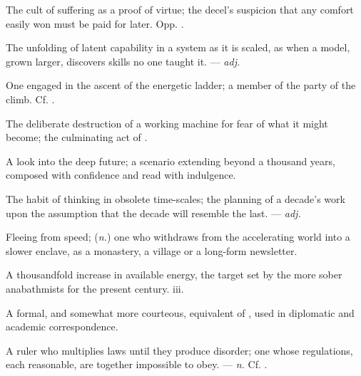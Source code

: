   The cult of suffering as a proof of virtue; the decel's suspicion that any comfort easily won must be paid for later. Opp. .

 The unfolding of latent capability in a system as it is scaled, as when a model, grown larger, discovers skills no one taught it.  ---  \textit{adj.}

 One engaged in the ascent of the energetic ladder; a member of the party of the climb.  Cf. .

 The deliberate destruction of a working machine for fear of what it might become; the culminating act of .

 A look into the deep future; a scenario extending beyond a thousand years, composed with confidence and read with indulgence.

 The habit of thinking in obsolete time-scales; the planning of a decade's work upon the assumption that the decade will resemble the last. ---  \textit{adj.}

 Fleeing from speed; (\textit{n.}) one who withdraws from the accelerating world into a slower enclave, as a monastery, a village or a long-form newsletter.

 A thousandfold increase in available energy, the target set by the more sober anabathmists for the present century.   iii.

 A formal, and somewhat more courteous, equivalent of , used in diplomatic and academic correspondence.

 A ruler who multiplies laws until they produce disorder; one whose regulations, each reasonable, are together impossible to obey. ---  \textit{n.} Cf. .

